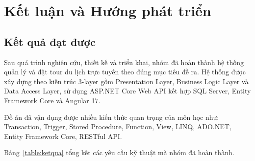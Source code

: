 
\chapter{Kết luận và Hướng phát triển}

\section{Kết quả đạt được}\label{Sec5.1}

Sau quá trình nghiên cứu, thiết kế và triển khai, nhóm đã hoàn thành hệ thống
quản lý và đặt tour du lịch trực tuyến theo đúng mục tiêu đề ra. Hệ thống được
xây dựng theo kiến trúc 3-layer gồm Presentation Layer, Business Logic Layer
và Data Access Layer, sử dụng ASP.NET Core Web API kết hợp SQL Server,
Entity Framework Core và Angular 17.

Đồ án đã vận dụng được nhiều kiến thức quan trọng của môn học như:
Transaction, Trigger, Stored Procedure, Function, View, LINQ, ADO.NET,
Entity Framework Core, RESTful API.

Bảng~\ref{table:ketqua} tổng kết các yêu cầu kỹ thuật mà nhóm đã hoàn thành.

